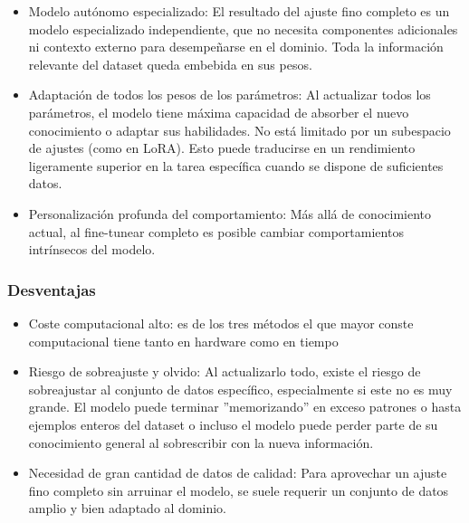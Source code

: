 \begin{itemize}
    \item Modelo autónomo especializado: El resultado del ajuste fino completo es un modelo especializado independiente, que no necesita componentes adicionales ni contexto externo para desempeñarse en el dominio. Toda la información relevante del dataset queda embebida en sus pesos.

    \item Adaptación de todos los pesos de los parámetros: Al actualizar todos los parámetros, el modelo tiene máxima capacidad de absorber el nuevo conocimiento o adaptar sus habilidades. No está limitado por un subespacio de ajustes (como en LoRA). Esto puede traducirse en un rendimiento ligeramente superior en la tarea específica cuando se dispone de suficientes datos.

    \item Personalización profunda del comportamiento: Más allá de conocimiento actual, al fine-tunear completo es posible cambiar comportamientos intrínsecos del modelo.
\end{itemize}

\subsubsection{Desventajas}
\begin{itemize}

    \item Coste computacional alto: es de los tres métodos el que mayor conste computacional tiene tanto en hardware como en tiempo

    \item Riesgo de sobreajuste y olvido: Al actualizarlo todo, existe el riesgo de sobreajustar al conjunto de datos específico, especialmente si este no es muy grande. El modelo puede terminar ''memorizando'' en exceso patrones o hasta ejemplos enteros del dataset o incluso el modelo puede perder parte de su conocimiento general al sobrescribir con la nueva información.

    \item Necesidad de gran cantidad de datos de calidad: Para aprovechar un ajuste fino completo sin arruinar el modelo, se suele requerir un conjunto de datos amplio y bien adaptado al dominio.
\end{itemize}

